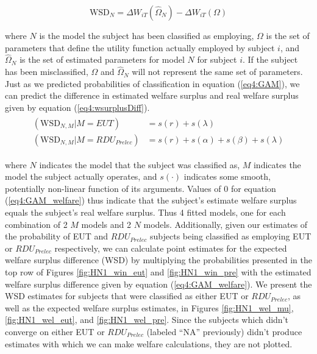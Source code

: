 \documentclass[../main.tex]{subfiles}
\begin{document}
\begin{equation}
	\label{eq4:wsurplusDiff}
	\text{WSD}_N = \Delta W_{iT}(\hat{\Omega}_N) - \Delta W_{iT}(\Omega)
\end{equation}

\noindent where $N$ is the model the subject has been classified as employing, $\Omega$ is the set of parameters that define the utility function actually employed by subject $i$, and $\hat{\Omega}_N$ is the set of estimated parameters for model $N$ for subject $i$.
If the subject has been misclassified, $\Omega$ and $\hat{\Omega}_N$ will not represent the same set of parameters.
Just as we predicted probabilities of classification in equation (\ref{eq4:GAM}), we can predict the difference in estimated welfare surplus and real welfare surplus given by equation (\ref{eq4:wsurplusDiff}).
\begin{align}
	\label{eq4:GAM_welfare}
	\begin{split}
		(\text{WSD}_{N,M} | M = EUT)                   &= s(r) + s(\lambda)\\
		(\text{WSD}_{N,M} | M = \mathit{RDU_{Prelec}}) &= s(r) + s(\alpha) + s(\beta) + s(\lambda)
	\end{split}
\end{align}

\noindent where $N$ indicates the model that the subject was classified as, $M$ indicates the model the subject actually operates, and $s(\cdot)$ indicates some smooth, potentially non-linear function of its arguments.
Values of 0 for equation (\ref{eq4:GAM_welfare}) thus indicate that the subject's estimate welfare surplus equals the subject's real welfare surplus.
Thus 4 fitted models, one for each combination of 2 $M$ models and 2 $N$ models.
Additionally, given our estimates of the probability of EUT and $\mathit{RDU_{Prelec}}$ subjects being classified as employing EUT or $\mathit{RDU_{Prelec}}$ respectively, we can calculate point estimates for the expected welfare surplus difference (WSD) by multiplying the probabilities presented in the top row of Figures \ref{fig:HN1_win_eut} and \ref{fig:HN1_win_pre} with the estimated welfare surplus difference given by equation (\ref{eq4:GAM_welfare}).
We present the WSD estimates for subjects that were classified as either EUT or $\mathit{RDU_{Prelec}}$, as well as the expected welfare surplus estimates, in Figures \ref{fig:HN1_wel_mu}, \ref{fig:HN1_wel_eut}, and \ref{fig:HN1_wel_pre}.
Since the subjects which didn't converge on either EUT or $\mathit{RDU_{Prelec}}$ (labeled \enquote{NA} previously) didn't produce estimates with which we can make welfare calculations, they are not plotted.
\end{document}

